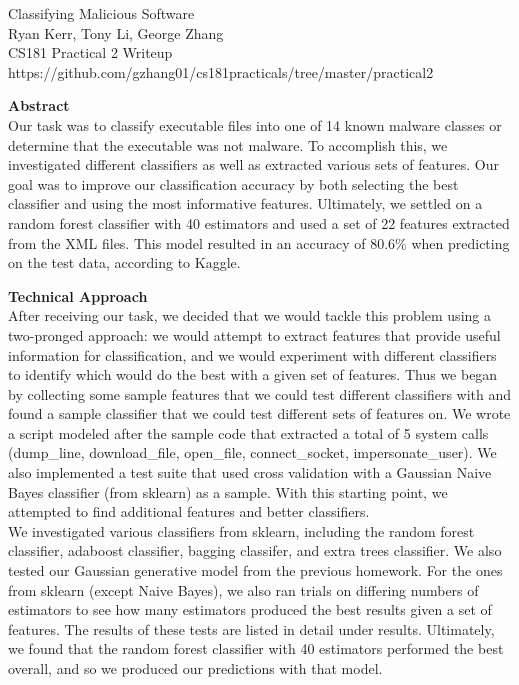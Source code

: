 \documentclass[12pt]{article}
\begin{document}
\begin{center}
Classifying Malicious Software \\
Ryan Kerr, Tony Li, George Zhang \\ 
CS181 Practical 2 Writeup \\
https://github.com/gzhang01/cs181practicals/tree/master/practical2 \\
\end{center}

\bigskip
\bigskip

\textbf{Abstract} \\
Our task was to classify executable files into one of 14 known malware classes or determine that the executable was not malware. To accomplish this, we investigated different classifiers as well as extracted various sets of features. Our goal was to improve our classification accuracy by both selecting the best classifier and using the most informative features. Ultimately, we settled on a random forest classifier with 40 estimators and used a set of 22 features extracted from the XML files. This model resulted in an accuracy of 80.6\% when predicting on the test data, according to Kaggle. \\

\bigskip

\textbf{Technical Approach} \\
After receiving our task, we decided that we would tackle this problem using a two-pronged approach: we would attempt to extract features that provide useful information for classification, and we would experiment with different classifiers to identify which would do the best with a given set of features. Thus we began by collecting some sample features that we could test different classifiers with and found a sample classifier that we could test different sets of features on. We wrote a script modeled after the sample code that extracted a total of 5 system calls (dump\_line, download\_file, open\_file, connect\_socket, impersonate\_user). We also implemented a test suite that used cross validation with a Gaussian Naive Bayes classifier (from sklearn) as a sample. With this starting point, we attempted to find additional features and better classifiers.  \\

We investigated various classifiers from sklearn, including the random forest classifier, adaboost classifier, bagging classifer, and extra trees classifier. We also tested our Gaussian generative model from the previous homework. For the ones from sklearn (except Naive Bayes), we also ran trials on differing numbers of estimators to see how many estimators produced the best results given a set of features. The results of these tests are listed in detail under results. Ultimately, we found that the random forest classifier with 40 estimators performed the best overall, and so we produced our predictions with that model. \\
\end{document}
